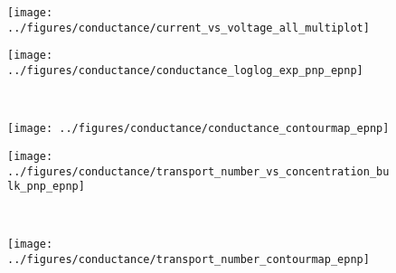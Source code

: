 \begin{figure*}[!p]
  \centering

  \begin{minipage}[l]{16cm}
    \begin{minipage}[h]{5cm}
      \begin{subfigure}[t]{4.5cm}
        \centering
        \caption{}\vspace{-3mm}\label{fig:current-voltage_curves}
        \texttt{[image: ../figures/conductance/current\_vs\_voltage\_all\_multiplot]}
      \end{subfigure}
    \end{minipage}
    \begin{minipage}[h]{5cm}
      \begin{subfigure}[t]{5cm}
        \centering
        \caption{}\vspace{0mm}\label{fig:conductance_loglog_exp_pnp_epnp}
        \texttt{[image: ../figures/conductance/conductance\_loglog\_exp\_pnp\_epnp]}
      \end{subfigure}
      \\
      \begin{subfigure}[t]{5cm}
        \centering
        \caption{}\vspace{0mm}\label{fig:conductance_contourmap_epnp}
        \texttt{[image: ../figures/conductance/conductance\_contourmap\_epnp]}
      \end{subfigure}
    \end{minipage}
    \begin{minipage}[h]{5cm}
      \begin{subfigure}[t]{5cm}
        \centering
        \caption{}\vspace{0mm}\label{fig:transport_number_vs_concentration_bulk_pnp_epnp}
        \texttt{[image: ../figures/conductance/transport\_number\_vs\_concentration\_bulk\_pnp\_epnp]}
      \end{subfigure}
      \\
      \begin{subfigure}[t]{5cm}
        \centering
        \caption{}\vspace{0mm}\label{fig:transport_number_contourmap_epnp}
        \texttt{[image: ../figures/conductance/transport\_number\_contourmap\_epnp]}
      \end{subfigure}
    \end{minipage}
  \end{minipage}


\end{figure*}
